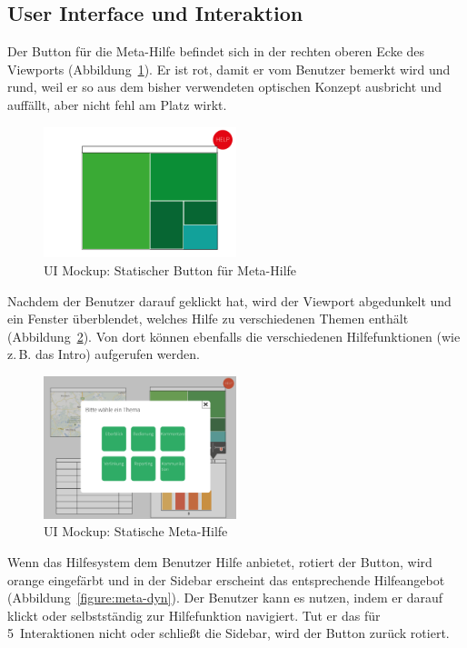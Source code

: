 \documentclass[
	headsepline,
	footsepline,
	fontsize=12pt,
	bibliography=totoc
]{scrbook}
\begin{document}
\subsection{User Interface und Interaktion}

Der Button für die Meta-Hilfe befindet sich in der rechten oberen Ecke des Viewports (Abbildung~\ref{figure:meta-step1}). Er ist rot, damit er vom Benutzer bemerkt wird und rund, weil er so aus dem bisher verwendeten optischen Konzept ausbricht und auffällt, aber nicht fehl am Platz wirkt.

\begin{figure}[htbp]
   \centering
   \includegraphics[width=0.5\textwidth]{images/konzeption-meta-step1.png}
   \caption{UI Mockup: Statischer Button für Meta-Hilfe}
   \label{figure:meta-step1}
\end{figure}

Nachdem der Benutzer darauf geklickt hat, wird der Viewport abgedunkelt und ein Fenster überblendet, welches Hilfe zu verschiedenen Themen enthält (Abbildung~\ref{figure:meta-step2}). Von dort können ebenfalls die verschiedenen Hilfefunktionen (wie z.\,B. das Intro) aufgerufen werden.

\begin{figure}[htbp]
   \centering
   \includegraphics[width=0.5\textwidth]{images/konzeption-meta-step2.png}
   \caption{UI Mockup: Statische Meta-Hilfe}
   \label{figure:meta-step2}
\end{figure}

Wenn das Hilfesystem dem Benutzer Hilfe anbietet, rotiert der Button, wird orange eingefärbt und in der Sidebar erscheint das entsprechende Hilfeangebot (Abbildung~\ref{figure:meta-dyn}). Der Benutzer kann es nutzen, indem er darauf klickt oder selbstständig zur Hilfefunktion navigiert. Tut er das für 5~Interaktionen nicht oder schließt die Sidebar, wird der Button zurück rotiert. 
\end{document}

